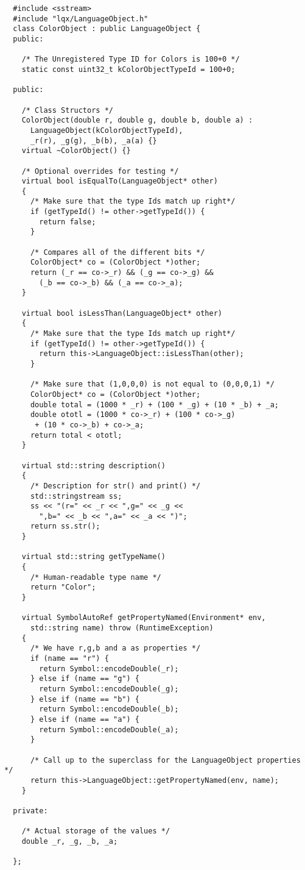 \documentclass[]{article}
\begin{document}
  \lstset{language=C++}
  \begin{lstlisting}
  #include <sstream>
  #include "lqx/LanguageObject.h"
  class ColorObject : public LanguageObject {
  public:

    /* The Unregistered Type ID for Colors is 100+0 */
    static const uint32_t kColorObjectTypeId = 100+0;

  public:

    /* Class Structors */
    ColorObject(double r, double g, double b, double a) : 
      LanguageObject(kColorObjectTypeId),
      _r(r), _g(g), _b(b), _a(a) {}
    virtual ~ColorObject() {}

    /* Optional overrides for testing */
    virtual bool isEqualTo(LanguageObject* other)
    {
      /* Make sure that the type Ids match up right*/
      if (getTypeId() != other->getTypeId()) {
        return false;
      }

      /* Compares all of the different bits */
      ColorObject* co = (ColorObject *)other;
      return (_r == co->_r) && (_g == co->_g) &&
        (_b == co->_b) && (_a == co->_a);
    }

    virtual bool isLessThan(LanguageObject* other)
    {
      /* Make sure that the type Ids match up right*/
      if (getTypeId() != other->getTypeId()) {
        return this->LanguageObject::isLessThan(other);
      }

      /* Make sure that (1,0,0,0) is not equal to (0,0,0,1) */
      ColorObject* co = (ColorObject *)other;
      double total = (1000 * _r) + (100 * _g) + (10 * _b) + _a;
      double ototl = (1000 * co->_r) + (100 * co->_g)
       + (10 * co->_b) + co->_a;
      return total < ototl;
    }

    virtual std::string description()
    {
      /* Description for str() and print() */
      std::stringstream ss;
      ss << "(r=" << _r << ",g=" << _g <<
        ",b=" << _b << ",a=" << _a << ")";
      return ss.str();
    }

    virtual std::string getTypeName()
    {
      /* Human-readable type name */
      return "Color";
    }

    virtual SymbolAutoRef getPropertyNamed(Environment* env, 
      std::string name) throw (RuntimeException)
    {
      /* We have r,g,b and a as properties */
      if (name == "r") {
        return Symbol::encodeDouble(_r);
      } else if (name == "g") {
        return Symbol::encodeDouble(_g);
      } else if (name == "b") {
        return Symbol::encodeDouble(_b);
      } else if (name == "a") {
        return Symbol::encodeDouble(_a);
      }

      /* Call up to the superclass for the LanguageObject properties */
      return this->LanguageObject::getPropertyNamed(env, name);
    }

  private:

    /* Actual storage of the values */
    double _r, _g, _b, _a;

  };
  \end{lstlisting}
  
\end{document}
